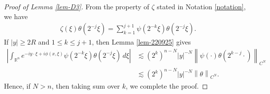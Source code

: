 \documentclass[12pt]{amsart}
\numberwithin{equation}{section}
\theoremstyle{plain}
\theoremstyle{definition}
\newcommand{\R}{\mathbb{R}}
\begin{document}
\begin{proof}[Proof of Lemma \ref{lem-D3}]
From the property of $\zeta$ stated in Notation \ref{notation}, 
we have 
\begin{align*}
\zeta (\xi) \theta (2^{-j} \xi) 
=
\sum_{k=1}^{j+1} 
\psi (2^{-k} \xi) \theta (2^{-j}\xi) .
\end{align*}
If $|y| \ge 2R$ and $1 \le k\le j+1$, then 
Lemma \ref{lem-220925} gives 
\begin{align*}
\left| \int_{\R^n} e^{-i y \cdot \xi + i \phi (x, \xi)} 
\psi (2^{-k}\xi) \theta (2^{-j}\xi) \,d\xi \right| 
&
\lesssim 
(2^{k}) ^{n-N}
|y|^{-N}
\left\| 
\psi (\cdot ) \theta (2^{k-j}\cdot )
\right\|_{C^{N}} 
\\
&
\lesssim 
(2^{k}) ^{n-N}
|y|^{-N}
\left\| 
\theta 
\right\|_{C^{N}} . 
\end{align*}
Hence, if $N>n$, then taking sum over $k$, 
we complete the proof. 
\end{proof}
\end{document}
